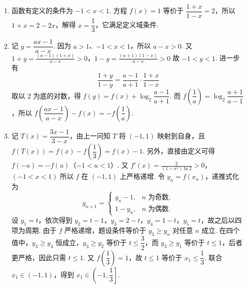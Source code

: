 \begin{solution}
\begin{enumerate}
\item 函数有定义的条件为 \(-1<x<1\). 方程 \(f(x)=1\) 等价于 \(\dfrac{1+x}{1-x}=2\)，所以 \(1+x=2-2x\)，解得 \(x=\dfrac13\)，它满足定义域条件.
\item 记 \(y=\dfrac{ax-1}{a-x}\). 因为 \(a>1\)、\(-1<x<1\)，所以 \(a-x>0\). 又
\(1+y=\frac{(a-1)(1+x)}{a-x}>0\)，\(1-y=\frac{(a+1)(1-x)}{a-x}>0\)
故 \(-1<y<1\). 进一步有
\[
\frac{1+y}{1-y}=\frac{a-1}{a+1}\cdot\frac{1+x}{1-x}
\]
取以 \(2\) 为底的对数，得 \(f(y)=f(x)+\log_2\dfrac{a-1}{a+1}\). 而 \(f\left(\dfrac1a\right)=\log_2\dfrac{a+1}{a-1}\)，所以 \(f\left(\dfrac{ax-1}{a-x}\right)-f(x)=-f\left(\dfrac1a\right)\).
\item 记 \(T(x)=\dfrac{3x-1}{3-x}\)，由上一问知 \(T\) 将 \((-1,1)\) 映射到自身，且 \(f(T(x))=f(x)-f\left(\dfrac13\right)=f(x)-1\). 另外，直接由定义可得 \(f(-u)=-f(u)\)（\(-1<u<1\)）. 又
\(f'(x)=\frac{2}{(1-x^2)\ln 2}>0\)，\((-1<x<1)\)
所以 \(f\) 在 \((-1,1)\) 上严格递增. 令 \(y_n=f(x_n)\)，递推式化为
\[
y_{n+1}=\begin{cases}
y_n-1,&n\text{ 为奇数},\\
1-y_n,&n\text{ 为偶数}.
\end{cases}
\]
设 \(y_1=t\)，依次得到 \(y_2=t-1\)，\(y_3=2-t\)，\(y_4=1-t\)，\(y_5=t\)，故之后以四项为周期. 由于 \(f\) 严格递增，题设条件等价于 \(y_3\ge y_n\) 对任意 \(n\) 成立. 在四个值中，\(y_3\ge y_4\) 恒成立，\(y_3\ge y_2\) 等价于 \(t\le\dfrac32\)，而 \(y_3\ge y_1\) 等价于 \(t\le1\)，后者更严格，因此只需 \(t\le1\). 又 \(f\left(\dfrac13\right)=1\)，故 \(t\le1\) 等价于 \(x_1\le\dfrac13\). 联合 \(x_1\in(-1,1)\)，得到 \(x_1\in\left(-1,\dfrac13\right]\).
\end{enumerate}
\end{solution}
